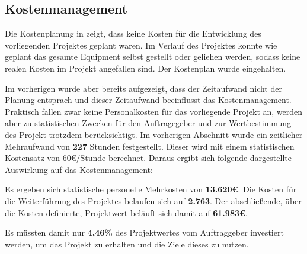 \subsection{Kostenmanagement}
\label{sec:Kostenmanagement}


Die Kostenplanung in  zeigt, dass keine Kosten für die Entwicklung des vorliegenden Projektes
geplant waren. Im Verlauf des Projektes konnte wie geplant das gesamte Equipment selbst gestellt oder geliehen werden,
sodass keine realen Kosten im Projekt angefallen sind. Der Kostenplan wurde eingehalten.

Im vorherigen  wurde aber bereits aufgezeigt, dass der Zeitaufwand nicht der Planung entsprach und
dieser Zeitaufwand beeinflusst das Kostenmanagement. Praktisch fallen zwar keine Personalkosten für das vorliegende Projekt
an, werden aber zu statistischen Zwecken für den Auftragegeber und zur
Wertbestimmung des Projekt trotzdem berücksichtigt. Im vorherigen Abschnitt wurde ein zeitlicher Mehraufwand von \textbf{227} Stunden festgestellt. Dieser
wird mit einem statistischen Kostensatz von 60€/Stunde berechnet. Daraus ergibt sich folgende dargestellte
Auswirkung auf das Kostenmanagement:


Es ergeben sich statistische personelle Mehrkosten von \textbf{13.620€}. Die Kosten
für die Weiterführung des Projektes belaufen sich auf \textbf{2.763}. Der abschließende,
über die Kosten definierte, Projektwert beläuft sich damit auf \textbf{61.983€}.

Es müssten damit nur \textbf{4,46\%} des Projektwertes vom Auftraggeber investiert werden,
um das Projekt zu erhalten und die Ziele dieses zu nutzen.